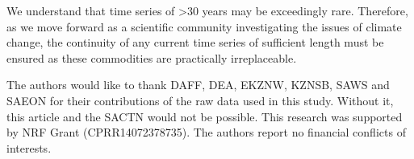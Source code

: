 \documentclass[]{ametsoc}
\begin{document}
We understand that time series of \textgreater 30 years may be exceedingly rare. Therefore, as we move forward as a scientific community investigating the issues of climate change, the continuity of any current time series of sufficient length must be ensured as these commodities are practically irreplaceable.
%

\acknowledgments
The authors would like to thank DAFF, DEA, EKZNW, KZNSB, SAWS and SAEON for their contributions of the raw data used in this study. Without it, this article and the SACTN would not be possible. This research was supported by NRF Grant (CPRR14072378735). The authors report no financial conflicts of interests.

%

% 
% 
\end{document}
